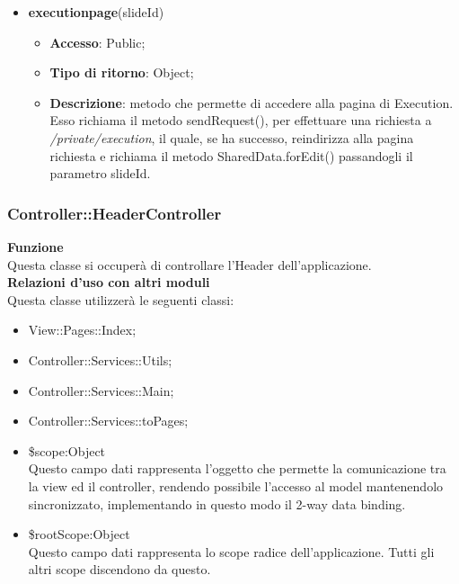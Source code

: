 {{{\begin{itemize}
				\item \textbf{executionpage}(slideId)
				\begin{itemize}
					\item \textbf{Accesso}: Public;
					\item \textbf{Tipo di ritorno}: Object;
					\item \textbf{Descrizione}: metodo che permette di accedere alla pagina di Execution. Esso richiama il metodo sendRequest(), per effettuare una richiesta a \textit{/private/execution}, il quale, se ha successo, reindirizza alla pagina richiesta e richiama il metodo SharedData.forEdit() passandogli il parametro slideId.
				\end{itemize}
			\end{itemize} 
		}
	}

	\subsubsection{Controller::\-HeaderController}
		\label{sub:HeaderController}
		\textbf{Funzione}\\
		\indent Questa classe si occuperà di controllare l'Header dell'applicazione.\\
		\textbf{Relazioni d'uso con altri moduli}\\
		\indent Questa classe utilizzerà le seguenti classi:
		\begin{itemize}
			\item View::\-Pages::\-Index;
			\item Controller::Services::\-Utils;
			\item Controller::Services::\-Main;
			\item Controller::Services::\-toPages;
			\item \$scope:Object\\
				\indent Questo campo dati rappresenta l’oggetto che permette la comunicazione tra la view ed il controller, rendendo possibile l’accesso al model mantenendolo sincronizzato, implementando in questo modo il 2-way data binding.
			\item \$rootScope:Object\\
				\indent Questo campo dati rappresenta lo scope radice dell’applicazione. Tutti gli altri scope discendono da questo.
		\end{itemize}

}
